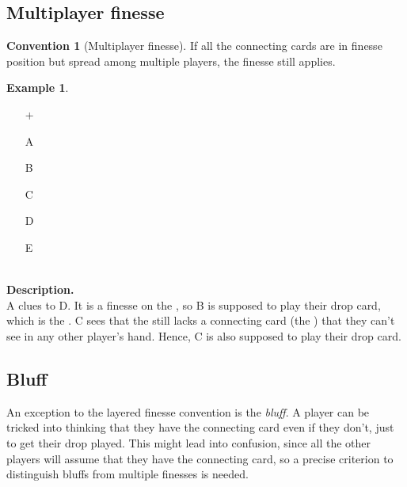 \documentclass[a4paper]{article}
\theoremstyle{plain}
\theoremstyle{definition}
\newtheorem{example}[theorem]{Example}
\newtheorem{convention}[theorem]{Convention}
\begin{document}
\subsection{Multiplayer finesse}

\begin{convention}[Multiplayer finesse]
	\label{multiplayer-finesse}
	If all the connecting cards are in finesse position but spread among multiple players, the finesse still applies.
\end{convention}

\begin{example} \hfill \\
	\begin{minipage}{0.45\textwidth}
		\begin{itemize}
			\item[\Large +]      
			\item[\Large A]    
			\item[\Large B]    
			\item[\Large C]    
			\item[\Large D]    
			\item[\Large E]    
		\end{itemize}
	\end{minipage}%
	\begin{minipage}{0.55\textwidth}
		\hfill \\
		
		\textbf{Description.} \\
		
		A clues  to D. It is a finesse on the , so B is supposed to play their drop card, which is the . C sees that the  still lacks a connecting card (the ) that they can't see in any other player's hand. Hence, C is also supposed to play their drop card.
	\end{minipage}
\end{example} \vspace{0.15 cm}

\subsection{Bluff}

An exception to the layered finesse convention is the \emph{bluff}. A player can be tricked into thinking that they have the connecting card even if they don't, just to get their drop played. This might lead into confusion, since all the other players will assume that they have the connecting card, so a precise criterion to distinguish bluffs from multiple finesses is needed.
\end{document}
